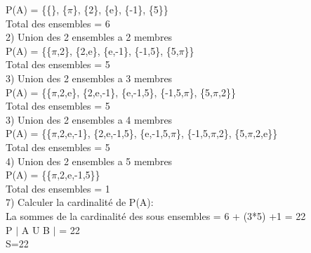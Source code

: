 P(A) = \{\{\}, \{$\pi$\}, \{2\}, \{e\}, \{-1\}, \{5\}\} \\

Total des ensembles = 6 \\

2) Union des 2 ensembles a 2 membres \\

P(A) = \{\{$\pi$,2\}, \{2,e\}, \{e,-1\}, \{-1,5\}, \{5,$\pi$\}\} \\

Total des ensembles = 5 \\

3) Union des 2 ensembles a 3 membres \\

P(A) = \{\{$\pi$,2,e\}, \{2,e,-1\}, \{e,-1,5\}, \{-1,5,$\pi$\}, \{5,$\pi$,2\}\} \\

Total des ensembles = 5 \\

3) Union des 2 ensembles a 4 membres \\

P(A) = \{\{$\pi$,2,e,-1\}, \{2,e,-1,5\}, \{e,-1,5,$\pi$\}, \{-1,5,$\pi$,2\}, \{5,$\pi$,2,e\}\} \\

Total des ensembles = 5 \\

4) Union des 2 ensembles a 5 membres \\

P(A) = \{\{$\pi$,2,e,-1,5\}\} \\

Total des ensembles = 1 \\

7) Calculer la cardinalité de P(A):\\

La sommes de la cardinalité des sous ensembles = 6 + (3*5) +1 = 22\\

P $|$ A U B $|$ = 22 \\

S=22 \\
